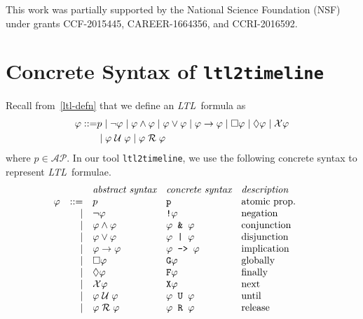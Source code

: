 \documentclass[conference]{IEEEtran}
\theoremstyle{definition}
\theoremstyle{remark}
\newcommand{\AP}{\mathcal{AP}}
\newcommand{\always}{\Box}
\newcommand{\eventually}{\Diamond}
\newcommand{\nextt}{\mathcal{X}}
\newcommand{\limplies}{\rightarrow}
\newcommand{\ltl}{\textit{LTL}}
\newcommand{\stronguntil}{\hspace{0.1cm} \mathcal{U}  \hspace{0.1cm}}
\newcommand{\weakrelease}{\hspace{0.1cm} \mathcal{R} \hspace{0.1cm}}
\newcommand{\tool}{\hspace{0.1cm}\texttt{ltl2timeline}}
\begin{document}
This work was partially supported by the National Science Foundation (NSF) under grants CCF-2015445, CAREER-1664356, and CCRI-2016592.

\appendix
\section{Concrete Syntax of \tool} \label{sec:concrete-syntax}
Recall from~\ref{ltl-defn} that we define an \ltl\ formula as
\begin{align*}
    \varphi ::= & p \mid \neg \varphi \mid \varphi \land \varphi \mid \varphi \lor \varphi \mid \varphi \limplies \varphi \mid \always \varphi \mid \eventually \varphi \mid \nextt \varphi \\ & \mid \varphi \stronguntil \varphi \mid \varphi \weakrelease \varphi
\end{align*}
where $p \in \AP$. In our tool \tool, we use the following concrete syntax to represent \ltl\ formulae.
\[
    \begin{array}{c r l l l@{\qquad} l}
         &      & \textit{abstract syntax}              & \textit{concrete syntax}                       & \textit{description} \\
    \varphi & ::=  & p                                     & \texttt{p}                                     & \text{atomic prop.} \\
         & \mid & \neg \varphi                             & \texttt{!} \varphi                                & \text{negation} \\
         & \mid & \varphi \land \varphi                       & \varphi \texttt{ \& } \varphi                        & \text{conjunction} \\
         & \mid & \varphi \lor \varphi                        & \varphi \texttt{ | } \varphi                         & \text{disjunction} \\
         & \mid & \varphi \limplies \varphi                   & \varphi \texttt{ -> } \varphi                        & \text{implication} \\
         & \mid & \always \varphi                          & \texttt{G} \varphi                                & \text{globally} \\
         & \mid & \eventually \varphi                      & \texttt{F} \varphi                                & \text{finally} \\
         & \mid & \nextt \varphi                           & \texttt{X} \varphi                                & \text{next} \\
         & \mid & \varphi \stronguntil \varphi                & \varphi \texttt{ U } \varphi                         & \text{until} \\
         & \mid & \varphi \weakrelease \varphi                & \varphi \texttt{ R } \varphi                         & \text{release} \\
    \end{array}
\]


\end{document}
